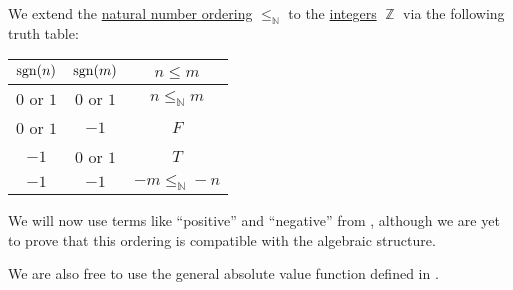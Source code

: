 \begin{definition}\label{def:integer_ordering}\mimprovised
  We extend the \hyperref[def:natural_numbers_ordering]{natural number ordering} \( \leq_\BbbN \) to the \hyperref[def:integers]{integers} \( \BbbZ \) via the following truth table:
  \begin{center}
    \begin{tabular}{c c c}
      \( \operatorname{sgn}(n) \)      & \( \operatorname{sgn}(m) \)      & \( n \leq m \)       \\
      \hline
      \( 0 \) or \( 1 \) & \( 0 \) or \( 1 \) & \( n \leq_\BbbN m \) \\
      \( 0 \) or \( 1 \) & \( -1 \)           & \( F \)              \\
      \( -1 \)           & \( 0 \) or \( 1 \) & \( T \)              \\
      \( -1 \)           & \( -1 \)           & \( -m \leq_\BbbN -n \)
    \end{tabular}
  \end{center}
\end{definition}
\begin{comments}
  \item We will now use terms like \enquote{positive} and \enquote{negative} from , although we are yet to prove that this ordering is compatible with the algebraic structure.
  \item We are also free to use the general absolute value function defined in .
\end{comments}


